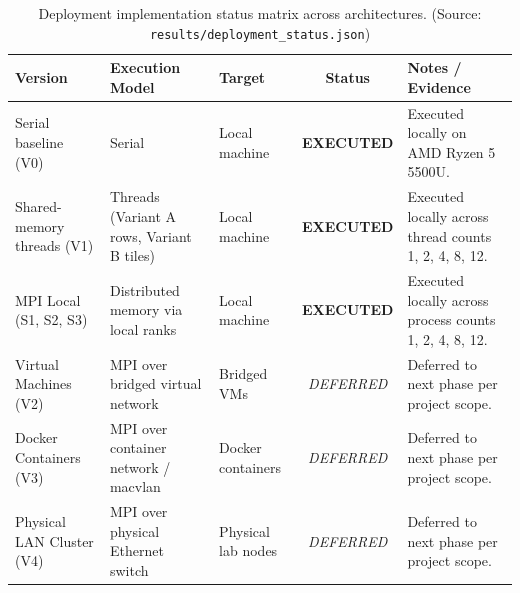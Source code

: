 \begin{table}[htbp]
\centering
\footnotesize
\setlength{\tabcolsep}{3pt}
\caption{Deployment implementation status matrix across architectures. (Source: \texttt{results/deployment\_status.json})}
\label{tab:deployment_status}
\begin{tabular}{>{\raggedright\arraybackslash}p{2.6cm}>{\raggedright\arraybackslash}p{3.3cm}>{\raggedright\arraybackslash}p{1.9cm}c>{\raggedright\arraybackslash}p{5.0cm}}
\toprule
\textbf{Version} & \textbf{Execution Model} & \textbf{Target} & \textbf{Status} & \textbf{Notes / Evidence} \\
\midrule
Serial baseline (V0) & Serial & Local machine & \textbf{EXECUTED} & Executed locally on AMD Ryzen 5 5500U. \\
Shared-memory threads (V1) & Threads (Variant A rows, Variant B tiles) & Local machine & \textbf{EXECUTED} & Executed locally across thread counts 1, 2, 4, 8, 12. \\
MPI Local (S1, S2, S3) & Distributed memory via local ranks & Local machine & \textbf{EXECUTED} & Executed locally across process counts 1, 2, 4, 8, 12. \\
Virtual Machines (V2) & MPI over bridged virtual network & Bridged VMs & \textit{DEFERRED} & Deferred to next phase per project scope. \\
Docker Containers (V3) & MPI over container network / macvlan & Docker containers & \textit{DEFERRED} & Deferred to next phase per project scope. \\
Physical LAN Cluster (V4) & MPI over physical Ethernet switch & Physical lab nodes & \textit{DEFERRED} & Deferred to next phase per project scope. \\
\bottomrule
\end{tabular}
\end{table}
